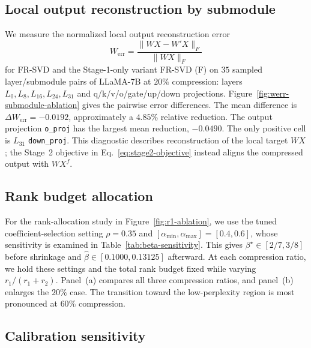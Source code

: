 \subsection{Local output reconstruction by submodule}\label{app:submodule-reconstruction}
We measure the normalized local output reconstruction error
\begin{equation}
W_{\mathrm{err}}=\frac{\|WX-W'X\|_F}{\|WX\|_F}
\label{eq:app-werr}
\end{equation}
for FR-SVD and the Stage-1-only variant FR-SVD (F) on $35$ sampled layer/submodule pairs of LLaMA-7B at $20\%$ compression: layers $L_0,L_8,L_{16},L_{24},L_{31}$ and q/k/v/o/gate/up/down projections. Figure~\ref{fig:werr-submodule-ablation} gives the pairwise error differences. The mean difference is $\Delta W_{\mathrm{err}}=-0.0192$, approximately a $4.85\%$ relative reduction. The output projection \texttt{o\_proj} has the largest mean reduction, $-0.0490$. The only positive cell is $L_{31}$ \texttt{down\_proj}. This diagnostic describes reconstruction of the local target $WX$; the Stage~2 objective in Eq.~\eqref{eq:stage2-objective} instead aligns the compressed output with $WX^f$.



\subsection{Rank budget allocation}\label{app:rank-allocation}
For the rank-allocation study in Figure~\ref{fig:r1-ablation}, we use the tuned coefficient-selection setting $\rho=0.35$ and $[\alpha_{\min},\alpha_{\max}]=[0.4,0.6]$, whose sensitivity is examined in Table~\ref{tab:beta-sensitivity}. This gives $\beta^\star\in[2/7,3/8]$ before shrinkage and $\widehat\beta\in[0.1000,0.13125]$ afterward. At each compression ratio, we hold these settings and the total rank budget fixed while varying $r_1/(r_1+r_2)$. Panel~(a) compares all three compression ratios, and panel~(b) enlarges the $20\%$ case. The transition toward the low-perplexity region is most pronounced at $60\%$ compression.



\subsection{Calibration sensitivity}\label{app:calibration-sensitivity}


